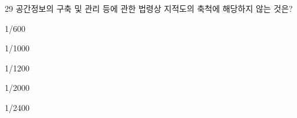 \begin{question}{29}
공간정보의 구축 및 관리 등에 관한 법령상 지적도의 축척에 해당하지 않는 것은?
\begin{choices}
  \item 1/600
  \item 1/1000
  \item 1/1200
  \item 1/2000
  \item 1/2400
\end{choices}
\end{question}
